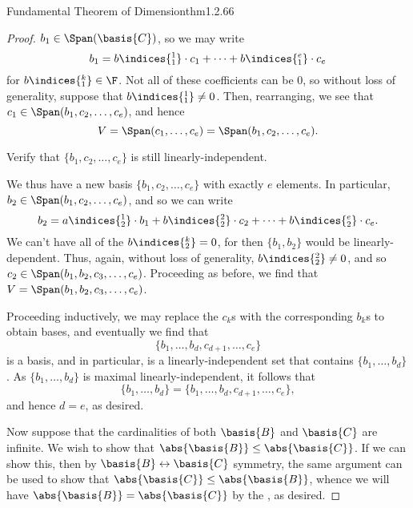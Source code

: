 \begin{thm}{Fundamental Theorem of Dimension}{thm1.2.66}
\begin{proof}
		$b_1\in \Span (\basis{C})$, so we may write
		\begin{equation}
		b_1=b\indices{^1_1}\cdot c_1+\cdots +b\indices{^e_1}\cdot c_e
		\end{equation}
		for $b\indices{^k_1}\in \F$.  Not all of these coefficients can be $0$, so without loss of generality, suppose that $b\indices{^1_1}\neq 0$.  Then, rearranging, we see that $c_1\in \Span (b_1,c_2,\ldots ,c_e)$, and hence
		\begin{equation}
		V=\Span (c_1,\ldots ,c_e)=\Span (b_1,c_2,\ldots ,c_e).
		\end{equation}
		\begin{exr}[breakable=false]{}{}
			Verify that $\{ b_1,c_2,\ldots ,c_e\}$ is still linearly-independent.
		\end{exr}
		We thus have a new basis $\{ b_1,c_2,\ldots ,c_e\}$ with exactly $e$ elements.  In particular, $b_2\in \Span (b_1,c_2,\ldots ,c_e)$, and so we can write
		\begin{equation}
		b_2=a\indices{^1_2}\cdot b_1+b\indices{^2_2}\cdot c_2+\cdots +b\indices{^e_2}\cdot c_e.
		\end{equation}
		We can't have all of the $b\indices{^k_2}=0$, for then $\{ b_1,b_2\}$ would be linearly-dependent.  Thus, again, without loss of generality, $b\indices{^2_2}\neq 0$, and so $c_2\in \Span (b_1,b_2,c_3,\ldots ,c_e)$.  Proceeding as before, we find that $V=\Span (b_1,b_2,c_3,\ldots ,c_e)$.
		
		Proceeding inductively, we may replace the $c_k$s with the corresponding $b_k$s to obtain bases, and eventually we find that
		\begin{equation}
		\{ b_1,\ldots ,b_d,c_{d+1},\ldots ,c_e\}
		\end{equation}
		is a basis, and in particular, is a linearly-independent set that contains $\{ b_1,\ldots ,b_d\}$.  As $\{ b_1,\ldots ,b_d\}$ is maximal linearly-independent, it follows that
		\begin{equation}
		\{ b_1,\ldots ,b_d\} =\{ b_1,\ldots ,b_d,c_{d+1},\ldots ,c_e\} ,
		\end{equation}
		and hence $d=e$, as desired.
		
		Now suppose that the cardinalities of both $\basis{B}$ and $\basis{C}$ are infinite.  We wish to show that $\abs{\basis{B}}\leq \abs{\basis{C}}$.  If we can show this, then by $\basis{B}\leftrightarrow \basis{C}$ symmetry, the same argument can be used to show that $\abs{\basis{C}}\leq \abs{\basis{B}}$, whence we will have $\abs{\basis{B}}=\abs{\basis{C}}$ by the , as desired.
		

\end{proof}
\end{thm}
